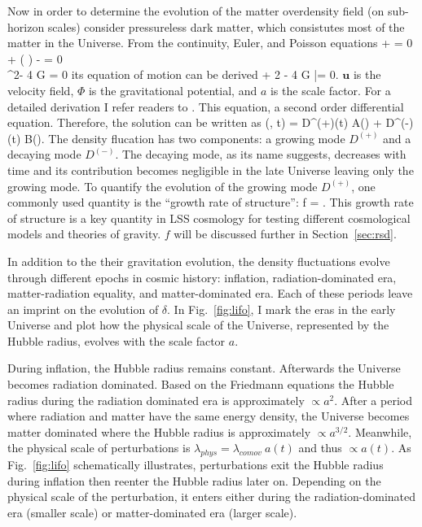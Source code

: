 Now in order to determine the evolution of the matter overdensity field
(on sub-horizon scales) consider pressureless dark matter, which consistutes 
most of the matter in the Universe. From the continuity, Euler, and Poisson equations
\beqa 
{} + \nabla \dot \rho {} = 0  \\ 
 + ( \dot \nabla) \dot {} - \nabla\Phi = 0 \\ 
\nabla^2\Phi - 4 \pi G \rho = 0 
\eeqa
its equation of motion can be derived
\beq \label{eq:meszaros}
 + 2   - 4 \pi G \bar{\rho}\;\delta = 0.
\eeq
$\bm{u}$ is the velocity field, $\Phi$ is the gravitational potential, and $a$ 
is the scale factor. For a detailed derivation I refer readers to 
\cite{peebles80, DodelsonBook}. This equation, a second order differential 
equation. Therefore, the solution can be written as 
\beq 
\delta(, t) = D^{(+)}(t) A() + D^{(-)}(t) B().
\eeq
The density flucation has two components: a growing mode $D^{(+)}$ and a decaying 
mode $D^{(-)}$. The decaying mode, as its name suggests, decreases with time 
and its contribution becomes negligible in the late Universe leaving only the 
growing mode. To quantify the evolution of the growing mode $D^{(+)}$, one 
commonly used quantity is the ``growth rate of structure'': 
\beq \label{eq:f_growth}
f = . 
\eeq
This growth rate of structure is a key quantity in LSS cosmology for testing different 
cosmological models and theories of gravity. $f$ will be discussed further in 
Section~\ref{sec:rsd}.

In addition to the their gravitation evolution, the density fluctuations 
evolve through different epochs in cosmic history: inflation, 
radiation-dominated era, matter-radiation equality, and matter-dominated era. Each of 
these periods leave an imprint on the evolution of $\delta$. In Fig.~\ref{fig:lifo}, 
I mark the eras in the early Universe and plot how the physical scale of 
the Universe, represented by the Hubble radius, evolves with the scale factor $a$. 

During inflation, the Hubble radius remains constant. Afterwards the Universe 
becomes radiation dominated. Based on the Friedmann equations the Hubble radius 
during the radiation dominated era is approximately $\propto a^{2}$. After a period 
where radiation and matter have the same energy density, the Universe 
becomes matter dominated where the Hubble radius is approximately $\propto a^{3/2}$. 
Meanwhile, the physical scale of perturbations is $\lambda_{phys} = \lambda_{comov}\ a(t)$ 
and thus $\propto a(t)$. As Fig.~\ref{fig:lifo} schematically illustrates, 
perturbations exit the Hubble radius during inflation then 
reenter the Hubble radius later on. 
Depending on the physical scale of the perturbation, it enters either
during the radiation-dominated era (smaller scale) or matter-dominated era (larger scale). 


